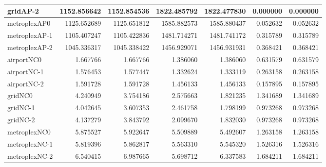 \begin{longtable}{|l|r|r|r|r|r|r|}
gridAP-2 & 1152.856642 & 1152.854536 & 1822.485792 & 1822.477830 & 0.000000 & 0.000000 \\ \hline
metroplexAP0 & 1125.652689 & 1125.651812 & 1585.882573 & 1585.880437 & 0.052632 & 0.052632 \\ \hline
metroplexAP-1 & 1105.407247 & 1105.422836 & 1481.714271 & 1481.741172 & 0.315789 & 0.315789 \\ \hline
metroplexAP-2 & 1045.336317 & 1045.338422 & 1456.929071 & 1456.931931 & 0.368421 & 0.368421 \\ \hline
airportNC0 & 1.667766 & 1.667766 & 1.386060 & 1.386060 & 0.631579 & 0.631579 \\ \hline
airportNC-1 & 1.576453 & 1.577447 & 1.332624 & 1.333119 & 0.263158 & 0.263158 \\ \hline
airportNC-2 & 1.591728 & 1.591728 & 1.456133 & 1.456133 & 0.157895 & 0.157895 \\ \hline
gridNC0 & 4.240949 & 3.754186 & 2.575663 & 1.821235 & 1.341689 & 1.341689 \\ \hline
gridNC-1 & 4.042645 & 3.607353 & 2.461758 & 1.798199 & 0.973268 & 0.973268 \\ \hline
gridNC-2 & 4.137279 & 3.843792 & 2.099670 & 1.832030 & 0.973268 & 0.973268 \\ \hline
metroplexNC0 & 5.875527 & 5.922647 & 5.509889 & 5.492607 & 1.263158 & 1.263158 \\ \hline
metroplexNC-1 & 5.819396 & 5.862817 & 5.563310 & 5.545320 & 1.526316 & 1.526316 \\ \hline
metroplexNC-2 & 6.540415 & 6.987665 & 5.698712 & 6.337583 & 1.684211 & 1.684211 \\ \hline
\end{longtable}
